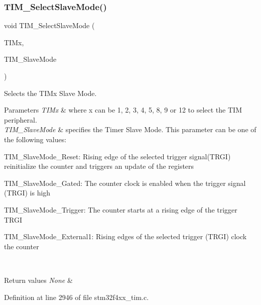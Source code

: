 \subsubsection{\texorpdfstring{T\+I\+M\+\_\+\+Select\+Slave\+Mode()}{TIM\_SelectSlaveMode()}}
{\footnotesize\ttfamily void T\+I\+M\+\_\+\+Select\+Slave\+Mode (\begin{DoxyParamCaption}\item[{\hyperlink{struct_t_i_m___type_def}{T\+I\+M\+\_\+\+Type\+Def} $\ast$}]{T\+I\+Mx,  }\item[{uint16\+\_\+t}]{T\+I\+M\+\_\+\+Slave\+Mode }\end{DoxyParamCaption})}



Selects the T\+I\+Mx Slave Mode. 


\begin{DoxyParams}{Parameters}
{\em T\+I\+Mx} & where x can be 1, 2, 3, 4, 5, 8, 9 or 12 to select the T\+IM peripheral. \\
\hline
{\em T\+I\+M\+\_\+\+Slave\+Mode} & specifies the Timer Slave Mode. This parameter can be one of the following values\+: \begin{DoxyItemize}
\item T\+I\+M\+\_\+\+Slave\+Mode\+\_\+\+Reset\+: Rising edge of the selected trigger signal(\+T\+R\+G\+I) reinitialize the counter and triggers an update of the registers \item T\+I\+M\+\_\+\+Slave\+Mode\+\_\+\+Gated\+: The counter clock is enabled when the trigger signal (T\+R\+GI) is high \item T\+I\+M\+\_\+\+Slave\+Mode\+\_\+\+Trigger\+: The counter starts at a rising edge of the trigger T\+R\+GI \item T\+I\+M\+\_\+\+Slave\+Mode\+\_\+\+External1\+: Rising edges of the selected trigger (T\+R\+GI) clock the counter \end{DoxyItemize}
\\
\hline
\end{DoxyParams}

\begin{DoxyRetVals}{Return values}
{\em None} & \\
\hline
\end{DoxyRetVals}


Definition at line 2946 of file stm32f4xx\+\_\+tim.\+c.

\mbox{\label{group___t_i_m_gad6a388d498c7f299d00a9d0871943041}} 
